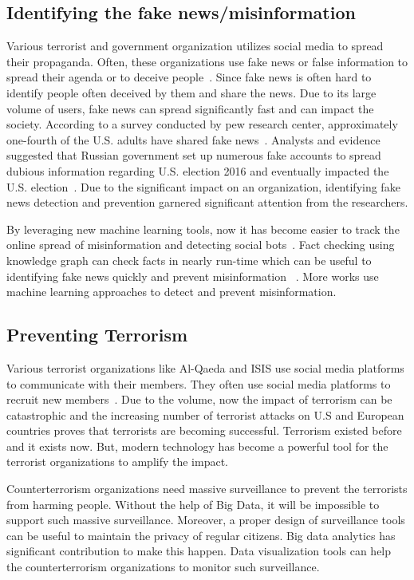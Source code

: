\documentclass[sigconf]{acmart}
\begin{document}
\subsection{Identifying the fake news/misinformation }
Various terrorist and government organization utilizes social media to spread their propaganda. Often, these organizations use fake news or false information to spread their agenda or to deceive people~\cite{Aymanns:2017}.  Since fake news is often hard to identify people often deceived by them and share the news. Due to its large volume of users, fake news can spread significantly fast and can impact the society. According to a survey conducted by pew research center, approximately one-fourth of the U.S. adults have shared fake news~\cite{fake2}. Analysts and evidence suggested that Russian government set up numerous fake accounts to spread dubious information regarding U.S. election 2016 and eventually impacted the U.S. election~\cite{fake2, Allcott:2017}.  Due to the significant impact on an organization, identifying fake news detection and prevention garnered significant attention from the researchers.

By leveraging new machine learning tools, now it has become easier to track the online spread of misinformation and detecting social bots~\cite{Shao17hoaxybots, Shao15hoaxy}. Fact checking using knowledge graph can check facts in nearly run-time which can be useful to identifying fake news quickly and prevent misinformation ~\cite{Shiralkar2017Finding-Streams}. More works use machine learning approaches to detect and prevent misinformation.



\subsection{Preventing Terrorism}
Various terrorist organizations like Al-Qaeda and ISIS use social media platforms to communicate with their members. They often use social media platforms to recruit new members~\cite{terrorism}. Due to the volume, now the impact of terrorism can be catastrophic and the increasing number of terrorist attacks on U.S and European countries proves that terrorists are becoming successful. Terrorism existed before and it exists now. But, modern technology has become a powerful tool for the terrorist organizations to amplify the impact. 

Counterterrorism organizations need massive surveillance to prevent the terrorists from harming people. Without the help of Big Data, it will be impossible to support such massive surveillance. Moreover, a proper design of surveillance tools can be useful to maintain the privacy of regular citizens. Big data analytics has significant contribution to make this happen. Data visualization tools can help the counterterrorism organizations to monitor such surveillance.
\end{document}
